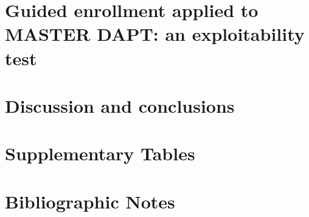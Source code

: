 \documentclass[twoside]{template}
\begin{document}
\chapter{Guided enrollment applied to MASTER DAPT: an exploitability test}
\label{chap:07}
\label{ch:guided-enrollment-applied}


\chapter{Discussion and conclusions}
\label{chap:08}


\appendix

\chapter{Supplementary Tables}
\label{app:supplementary-tables}


\chapter{Bibliographic Notes}
\label{app:references}


\backmatter


\end{document}
